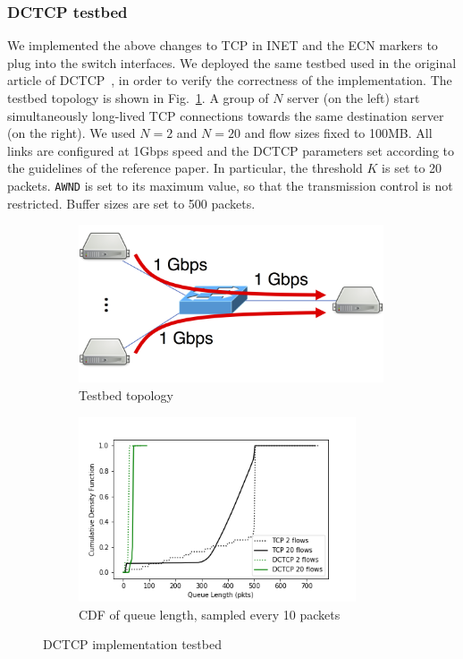 \subsubsection{DCTCP testbed}
We implemented the above changes to TCP in INET and the ECN markers to plug into the switch interfaces. We deployed the same testbed used in the original article of DCTCP~\cite{dctcp}, in order to verify the correctness of the implementation. The testbed topology is shown in Fig.~\ref{fig:dctcp-testbed-topology}. A group of $N$ server (on the left) start simultaneously long-lived TCP connections towards the same destination server (on the right). We used $N=2$ and $N=20$ and flow sizes fixed to 100MB. All links are configured at 1Gbps speed and the DCTCP parameters set according to the guidelines of the reference paper. In particular, the threshold $K$ is set to 20 packets. \texttt{AWND} is set to its maximum value, so that the transmission control is not restricted. Buffer sizes are set to 500 packets.\\ 
\begin{figure}
	\centering
	\begin{subfigure}{.35\textwidth}
		\centering
		\includegraphics[width=0.99\textwidth]{Chapter4/Figures/dctcp-testbed}
		\caption{Testbed topology}
		\label{fig:dctcp-testbed-topology}		
	\end{subfigure}%
	\hfill
	\begin{subfigure}{.65\textwidth}
		\centering
		\includegraphics[width=0.9\textwidth]{Chapter4/Figures/dctcp-qlen}
		\caption{CDF of queue length, sampled every 10 packets}
		\label{fig:dctcp-testbed-res}		
	\end{subfigure}%
	\caption{DCTCP implementation testbed}
	\label{fig:dctcp-testbed}
\end{figure}%
